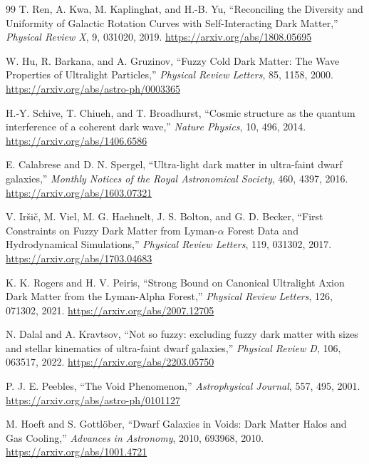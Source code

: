 \begin{thebibliography}{99}
T. Ren, A. Kwa, M. Kaplinghat, and H.-B. Yu,
``Reconciling the Diversity and Uniformity of Galactic Rotation Curves with Self-Interacting Dark Matter,''
\emph{Physical Review X}, 9, 031020, 2019.
\url{https://arxiv.org/abs/1808.05695}

W. Hu, R. Barkana, and A. Gruzinov,
``Fuzzy Cold Dark Matter: The Wave Properties of Ultralight Particles,''
\emph{Physical Review Letters}, 85, 1158, 2000.
\url{https://arxiv.org/abs/astro-ph/0003365}

H.-Y. Schive, T. Chiueh, and T. Broadhurst,
``Cosmic structure as the quantum interference of a coherent dark wave,''
\emph{Nature Physics}, 10, 496, 2014.
\url{https://arxiv.org/abs/1406.6586}

E. Calabrese and D. N. Spergel,
``Ultra-light dark matter in ultra-faint dwarf galaxies,''
\emph{Monthly Notices of the Royal Astronomical Society}, 460, 4397, 2016.
\url{https://arxiv.org/abs/1603.07321}

V. Ir\v{s}i\v{c}, M. Viel, M. G. Haehnelt, J. S. Bolton, and G. D. Becker,
``First Constraints on Fuzzy Dark Matter from Lyman-$\alpha$ Forest Data and Hydrodynamical Simulations,''
\emph{Physical Review Letters}, 119, 031302, 2017.
\url{https://arxiv.org/abs/1703.04683}

K. K. Rogers and H. V. Peiris,
``Strong Bound on Canonical Ultralight Axion Dark Matter from the Lyman-Alpha Forest,''
\emph{Physical Review Letters}, 126, 071302, 2021.
\url{https://arxiv.org/abs/2007.12705}

N. Dalal and A. Kravtsov,
``Not so fuzzy: excluding fuzzy dark matter with sizes and stellar kinematics of ultra-faint dwarf galaxies,''
\emph{Physical Review D}, 106, 063517, 2022.
\url{https://arxiv.org/abs/2203.05750}

P. J. E. Peebles,
``The Void Phenomenon,''
\emph{Astrophysical Journal}, 557, 495, 2001.
\url{https://arxiv.org/abs/astro-ph/0101127}

M. Hoeft and S. Gottl\"ober,
``Dwarf Galaxies in Voids: Dark Matter Halos and Gas Cooling,''
\emph{Advances in Astronomy}, 2010, 693968, 2010.
\url{https://arxiv.org/abs/1001.4721}


\end{thebibliography}
